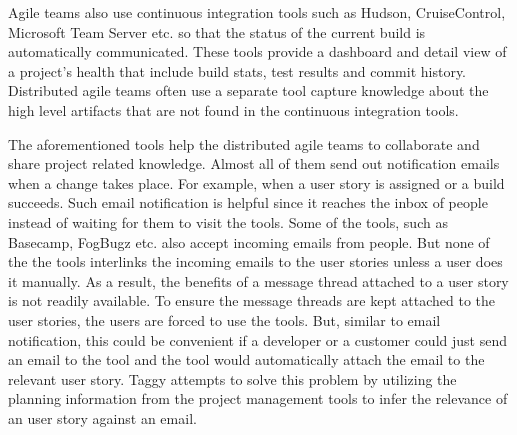 Agile teams also use continuous integration tools such as Hudson\cite{Hudson}, CruiseControl\cite{cruise_control}, Microsoft Team Server\cite{team_server} etc. so that the status of the current build is automatically communicated. These tools provide a dashboard and detail view of a project's health that include build stats, test results and commit history. Distributed agile teams often use a separate tool capture knowledge about the high level artifacts that are not found in the continuous integration tools.

The aforementioned tools help the distributed agile teams to collaborate and share project related knowledge. Almost all of them send out notification emails when a change takes place. For example, when a user story is assigned or a build succeeds. Such email notification is helpful since it reaches the inbox of people instead of waiting for them to visit the tools. Some of the tools, such as Basecamp, FogBugz etc. also accept incoming emails from people. But none of the the tools interlinks the incoming emails to the user stories unless a user does it manually. As a result, the benefits of a message thread attached to a user story is not readily available. To ensure the message threads are kept attached to the user stories, the users are forced to use the tools. But, similar to email notification, this could be convenient if a developer or a customer could just send an email to the tool and the tool would automatically attach the email to the relevant user story. Taggy attempts to solve this problem by utilizing the planning information from the project management tools to infer the relevance of an user story against an email.